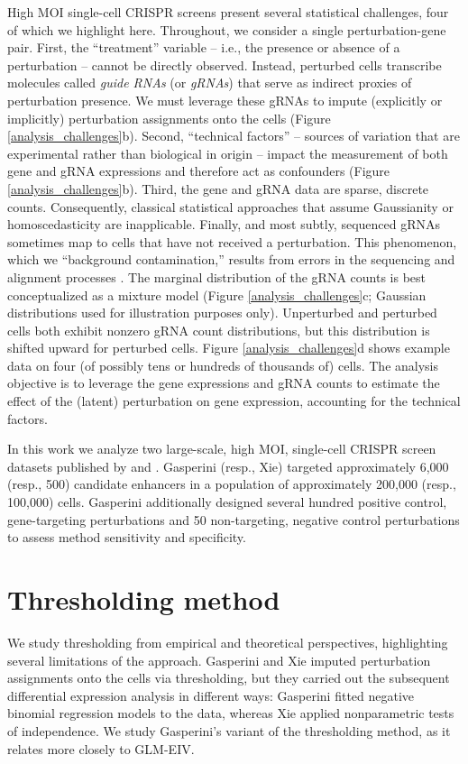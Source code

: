 \documentclass[12pt]{article}
\begin{document}
High MOI single-cell CRISPR screens present several statistical challenges, four of which we highlight here. Throughout, we consider a single perturbation-gene pair. First, the ``treatment'' variable -- i.e., the presence or absence of a perturbation -- cannot be directly observed. Instead, perturbed cells transcribe molecules called  \textit{guide RNAs} (or \textit{gRNAs}) that serve as indirect proxies of perturbation presence. We must leverage these gRNAs to impute (explicitly or implicitly) perturbation assignments onto the cells (Figure \ref{analysis_challenges}b). Second, ``technical factors'' -- sources of variation that are experimental rather than biological in origin -- impact the measurement of both gene and gRNA expressions and therefore act as confounders (Figure \ref{analysis_challenges}b). Third, the gene and gRNA data are sparse, discrete counts. Consequently, classical statistical approaches that assume Gaussianity or homoscedasticity are inapplicable. Finally, and most subtly, sequenced gRNAs sometimes map to cells that have not received a perturbation. This phenomenon, which we ``background contamination,'' results from errors in the sequencing and alignment processes \parencite{Replogle2020}. The marginal distribution of the gRNA counts is best conceptualized as a mixture model (Figure \ref{analysis_challenges}c; Gaussian distributions used for illustration purposes only). Unperturbed and perturbed cells both exhibit nonzero gRNA count distributions, but this distribution is shifted upward for perturbed cells. Figure \ref{analysis_challenges}d shows example data on four (of possibly tens or hundreds of thousands of) cells. The analysis objective is to leverage the gene expressions and gRNA counts to estimate the effect of the (latent) perturbation on gene expression, accounting for the technical factors.

In this work we analyze two large-scale, high MOI, single-cell CRISPR screen datasets published by \parencite{Gasperini2019} and \parencite{Xie2019a}. Gasperini (resp., Xie) targeted approximately 6,000 (resp., 500) candidate enhancers in a population of approximately 200,000 (resp., 100,000) cells. Gasperini additionally designed several hundred positive control, gene-targeting perturbations and 50 non-targeting, negative control perturbations to assess method sensitivity and specificity.

\section{Thresholding method}
We study thresholding from empirical and theoretical perspectives, highlighting several limitations of the approach. Gasperini and Xie imputed perturbation assignments onto the cells via thresholding, but they carried out the subsequent differential expression analysis in different ways: Gasperini fitted negative binomial regression models to the data, whereas Xie applied nonparametric tests of independence. We study Gasperini's variant of the thresholding method, as it relates more closely to GLM-EIV.
\end{document}
